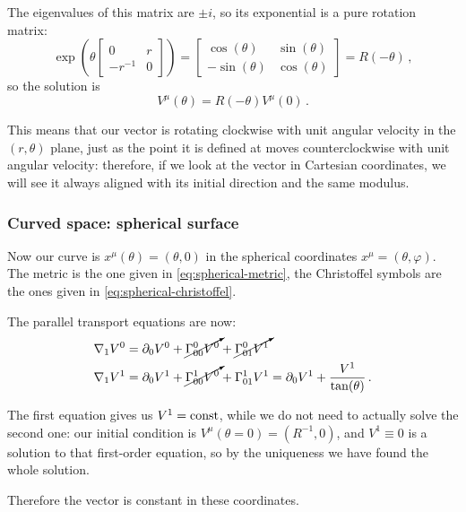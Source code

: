 \documentclass[main.tex]{subfiles}
\begin{document}
The eigenvalues of this matrix are \(\pm i\), so its exponential is a pure rotation matrix: 
%
\begin{equation}
  \exp(\theta \left[\begin{array}{cc}
  0 & r \\ 
  -r^{-1} & 0
  \end{array}\right]) =
  \left[\begin{array}{cc}
  \cos(\theta )  & \sin(\theta )  \\ 
  -\sin(\theta )  & \cos(\theta ) 
  \end{array}\right] = R(-\theta )
\,,
\end{equation}
%
so the solution is 
%
\begin{equation}
  V^{\mu }(\theta ) = R(-\theta )V^{\mu }(0)
\,.
\end{equation}

This means that our vector is rotating clockwise with unit angular velocity in the \((r, \theta )\) plane, just as the point it is defined at moves counterclockwise with unit angular velocity: therefore, if we look at the vector in Cartesian coordinates, we will see it always aligned with its initial direction and the same modulus.

\subsubsection{Curved space: spherical surface}

Now our curve is \(x^{\mu } (\theta ) = (\theta , 0)\) in the spherical coordinates \(x^{\mu } = (\theta, \varphi )\). The metric is the one given in \eqref{eq:spherical-metric}, the Christoffel symbols are the ones given in \eqref{eq:spherical-christoffel}.

The parallel transport equations are now: 
%
\begin{subequations}
\begin{align}
  \nabla_{1}V^{0} &= \partial_0 V^{0} + \cancelto{}{\Gamma^{0}_{00}V^{0}} + \cancelto{}{\Gamma^{0}_{01}V^{1} }  \\
  \nabla_{1}V^{1} &= \partial_0 V^{1} + \cancelto{}{\Gamma^{1}_{00}V^{0}} + \Gamma^{1}_{01}V^{1}
  = \partial_0 V^{1} + \frac{V^{1}}{\tan(\theta )}
\,.
\end{align}
\end{subequations}

The first equation gives us \(V^{1} = \text{const}\), while we do not need to actually solve the second one: our initial condition is \(V^{\mu}(\theta = 0) = (R^{-1}, 0)\), and \(V^{1} \equiv 0\) is a solution to that first-order equation, so by the uniqueness we have found the whole solution.

Therefore the vector is constant in these coordinates.
\end{document}
